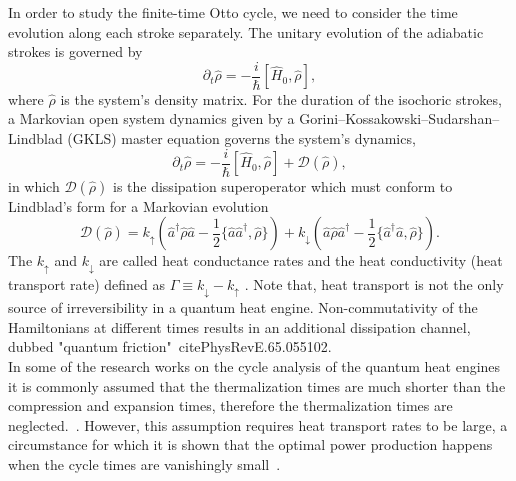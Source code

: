 \documentclass[aps,pra,twocolumn,showpacs,showkeys,groupedaddress,nobalancelastpage,nofootinbib,floatfix,superscriptaddress,longbibliography]{revtex4-2}
\begin{document}
In order to study the finite-time Otto cycle, we need to consider the time evolution along each stroke separately. The unitary evolution of the adiabatic strokes is governed by
\begin{equation}\label{unitary.dynamics}
   \partial_t\hat{\rho} = -\frac{i}{\hbar}[\hat{H}_0,\hat{\rho}],
\end{equation}
where $\hat{\rho}$ is the system's density matrix. For the duration of the isochoric strokes, a Markovian open system dynamics given by a Gorini–Kossakowski–Sudarshan–Lindblad (GKLS) master equation governs the system's dynamics,
\begin{equation}\label{lindblad.dynamics}
   \partial_t\hat{\rho} = -\frac{i}{\hbar}[\hat{H}_0,\hat{\rho}] + \mathcal{D}(\hat{\rho}),
\end{equation}
in which $\mathcal{D}(\hat{\rho})$ is the dissipation superoperator which must conform to Lindblad’s form for a Markovian evolution
 \begin{equation}\label{lindblad.diss}
   \mathcal{D}(\hat{\rho}) =  k_{\uparrow } (\hat{a}^\dagger \hat{\rho} \hat{a} - \frac{1}{2}\{\hat{a} \hat{a}^\dagger, \hat{\rho}\})+ k_{\downarrow } (\hat{a} \hat{\rho} \hat{a}^\dagger - \frac{1}{2}\{\hat{a}^\dagger \hat{a}, \hat{\rho}\}).
 \end{equation}
The $ k_{\uparrow }$ and $ k_{\downarrow }$ are called heat conductance rates and the heat conductivity (heat transport rate) defined as $\Gamma \equiv k_{\downarrow }-k_{\uparrow }$ \cite{Kosloff2017TheQH}. Note that, heat transport is not the only source of irreversibility in a quantum heat engine. Non-commutativity of the Hamiltonians at different times results in an additional dissipation channel, dubbed "quantum friction"~cite{PhysRevE.65.055102}.\\

In some of the research works on the cycle analysis of the quantum heat engines it is commonly assumed that the thermalization times are much shorter than the compression and expansion times, therefore the thermalization times are neglected.~\cite{PhysRevLett.112.030602,PhysRevE.98.032121,PhysRevE.99.022110,PhysRevE.99.032108,e18050168}. However, this assumption requires heat transport rates to be large, a circumstance for which it is shown that the optimal power production happens when the cycle times are vanishingly small~\cite{10.1119/1.18197,Rezek_2006,Kosloff2017TheQH}.\\
\end{document}
